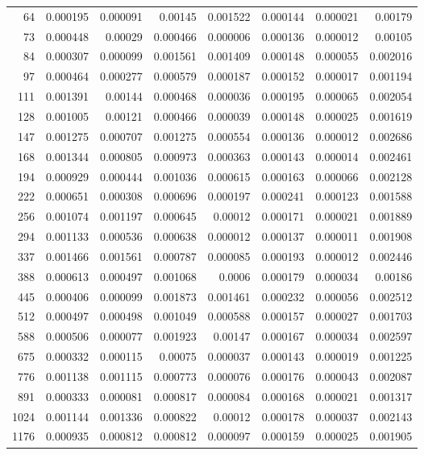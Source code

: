 \begin{longtable}{r r r r r r r r}
64 & 0.000195 & 0.000091 & 0.00145 & 0.001522 & 0.000144 & 0.000021 & 0.00179 \\
73 & 0.000448 & 0.00029 & 0.000466 & 0.000006 & 0.000136 & 0.000012 & 0.00105 \\
84 & 0.000307 & 0.000099 & 0.001561 & 0.001409 & 0.000148 & 0.000055 & 0.002016 \\
97 & 0.000464 & 0.000277 & 0.000579 & 0.000187 & 0.000152 & 0.000017 & 0.001194 \\
111 & 0.001391 & 0.00144 & 0.000468 & 0.000036 & 0.000195 & 0.000065 & 0.002054 \\
128 & 0.001005 & 0.00121 & 0.000466 & 0.000039 & 0.000148 & 0.000025 & 0.001619 \\
147 & 0.001275 & 0.000707 & 0.001275 & 0.000554 & 0.000136 & 0.000012 & 0.002686 \\
168 & 0.001344 & 0.000805 & 0.000973 & 0.000363 & 0.000143 & 0.000014 & 0.002461 \\
194 & 0.000929 & 0.000444 & 0.001036 & 0.000615 & 0.000163 & 0.000066 & 0.002128 \\
222 & 0.000651 & 0.000308 & 0.000696 & 0.000197 & 0.000241 & 0.000123 & 0.001588 \\
256 & 0.001074 & 0.001197 & 0.000645 & 0.00012 & 0.000171 & 0.000021 & 0.001889 \\
294 & 0.001133 & 0.000536 & 0.000638 & 0.000012 & 0.000137 & 0.000011 & 0.001908 \\
337 & 0.001466 & 0.001561 & 0.000787 & 0.000085 & 0.000193 & 0.000012 & 0.002446 \\
388 & 0.000613 & 0.000497 & 0.001068 & 0.0006 & 0.000179 & 0.000034 & 0.00186 \\
445 & 0.000406 & 0.000099 & 0.001873 & 0.001461 & 0.000232 & 0.000056 & 0.002512 \\
512 & 0.000497 & 0.000498 & 0.001049 & 0.000588 & 0.000157 & 0.000027 & 0.001703 \\
588 & 0.000506 & 0.000077 & 0.001923 & 0.00147 & 0.000167 & 0.000034 & 0.002597 \\
675 & 0.000332 & 0.000115 & 0.00075 & 0.000037 & 0.000143 & 0.000019 & 0.001225 \\
776 & 0.001138 & 0.001115 & 0.000773 & 0.000076 & 0.000176 & 0.000043 & 0.002087 \\
891 & 0.000333 & 0.000081 & 0.000817 & 0.000084 & 0.000168 & 0.000021 & 0.001317 \\
1024 & 0.001144 & 0.001336 & 0.000822 & 0.00012 & 0.000178 & 0.000037 & 0.002143 \\
1176 & 0.000935 & 0.000812 & 0.000812 & 0.000097 & 0.000159 & 0.000025 & 0.001905 \\

\end{longtable}
